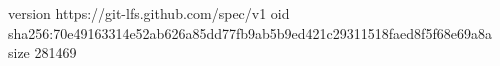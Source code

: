 version https://git-lfs.github.com/spec/v1
oid sha256:70e49163314e52ab626a85dd77fb9ab5b9ed421c29311518faed8f5f68e69a8a
size 281469
